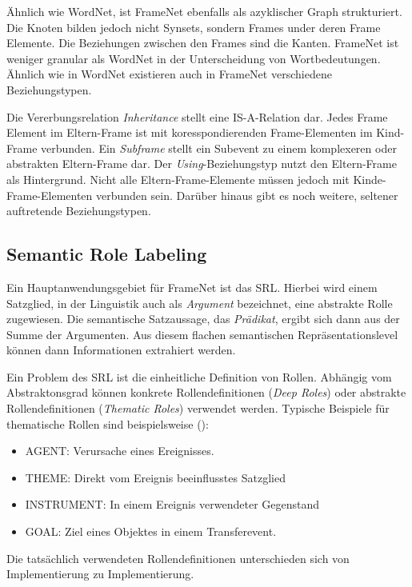 Ähnlich wie WordNet, ist FrameNet ebenfalls als azyklischer Graph strukturiert. Die Knoten bilden jedoch nicht Synsets, sondern Frames under deren Frame Elemente. Die Beziehungen zwischen den Frames sind die Kanten. FrameNet ist weniger granular als WordNet in der Unterscheidung von Wortbedeutungen. Ähnlich wie in WordNet existieren auch in FrameNet verschiedene Beziehungstypen.
\par
Die Vererbungsrelation \textit{Inheritance} stellt eine IS-A-Relation dar. Jedes Frame Element im Eltern-Frame ist mit koresspondierenden Frame-Elementen im Kind-Frame verbunden. Ein \textit{Subframe} stellt ein Subevent zu einem komplexeren oder abstrakten Eltern-Frame dar. Der 
\textit{Using}-Beziehungstyp nutzt den Eltern-Frame als Hintergrund. Nicht alle Eltern-Frame-Elemente müssen jedoch mit Kinde-Frame-Elementen verbunden sein. Darüber hinaus gibt es noch weitere, seltener auftretende Beziehungstypen.


\subsection{Semantic Role Labeling}

Ein Hauptanwendungsgebiet für FrameNet ist das \ac{SRL}. Hierbei wird einem Satzglied, in der Linguistik auch als \textit{Argument} bezeichnet, eine abstrakte Rolle zugewiesen. Die semantische Satzaussage, das \textit{Prädikat}, ergibt sich dann aus der Summe der Argumenten. Aus diesem flachen semantischen Repräsentationslevel können dann Informationen extrahiert werden.
\par
Ein Problem des \ac{SRL} ist die einheitliche Definition von Rollen. Abhängig vom Abstraktonsgrad können konkrete Rollendefinitionen (\textit{Deep Roles}) oder abstrakte Rollendefinitionen (\textit{Thematic Roles}) verwendet werden. Typische Beispiele für thematische Rollen sind beispielsweise (\cite[vgl.][379]{JURAFSKY}):
\begin{itemize}
\item AGENT: Verursache eines Ereignisses.
\item THEME: Direkt vom Ereignis beeinflusstes Satzglied
\item INSTRUMENT: In einem Ereignis verwendeter Gegenstand
\item GOAL: Ziel eines Objektes in einem Transferevent.
\end{itemize}
Die tatsächlich verwendeten Rollendefinitionen unterschieden sich von Implementierung zu Implementierung.

